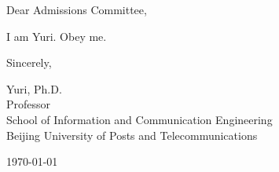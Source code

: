 \documentclass[12pt]{article}
\begin{document}
	Dear Admissions Committee,
	
	I am Yuri. Obey me.
	
	Sincerely,
	
	\bigskip	
	Yuri, Ph.D.\\
	Professor\\
	School of Information and Communication Engineering\\
	Beijing University of Posts and Telecommunications
	
	\bigskip
	\today
	
\end{document}

